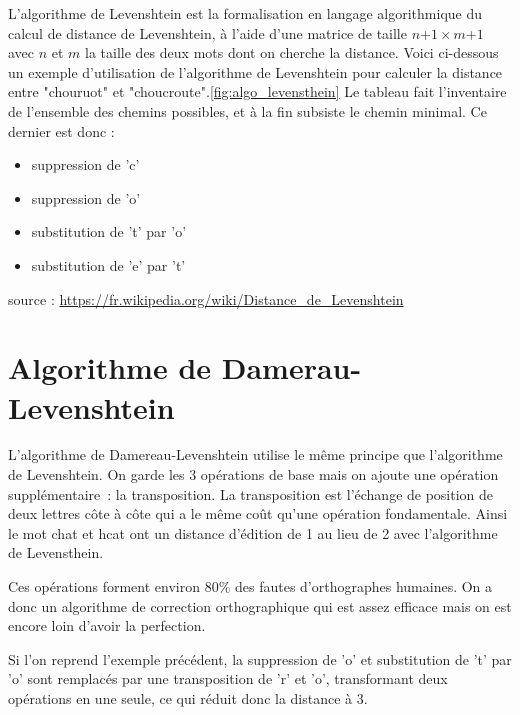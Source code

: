 \documentclass[final, 10pt]{report}
\begin{document}
L'algorithme de Levenshtein est la formalisation en langage algorithmique du calcul de distance de Levenshtein,  à l'aide d'une matrice de taille $n$+$1\times m$+$1$ avec $n$ et $m$ la taille des deux mots dont on cherche la distance.
Voici ci-dessous un exemple d'utilisation de l'algorithme de Levenshtein pour calculer la distance entre "chouruot" et "choucroute".\ref{fig:algo_levensthein}
Le tableau fait l'inventaire de l'ensemble des chemins possibles, et à la fin subsiste le chemin minimal.
Ce dernier est donc :
\begin{itemize}
    \item suppression de 'c'
    \item suppression de 'o'
    \item substitution de 't' par 'o'
    \item substitution de 'e' par 't'
\end{itemize}

\footnotesize source : \url{https://fr.wikipedia.org/wiki/Distance_de_Levenshtein}
\normalsize

\section{Algorithme de Damerau-Levenshtein\cite{noauthor_distance_2020}}

    L'algorithme de Damereau-Levenshtein utilise le même principe que l'algorithme de Levenshtein.
    On garde les 3 opérations de base mais on ajoute une opération supplémentaire~: la transposition.
    La transposition est l'échange de position de deux lettres côte à côte qui a le même coût qu'une opération fondamentale.
    Ainsi le mot \fg chat \og{} et \fg hcat\fg{} ont un distance d'édition de 1 au lieu de 2 avec l'algorithme de Levensthein.
    
    Ces opérations forment environ 80\% des fautes d'orthographes humaines.
    On a donc un algorithme de correction orthographique qui est assez efficace mais on est encore loin d'avoir la perfection.
    
    Si l'on reprend l'exemple précédent, la suppression de 'o' et substitution de 't' par 'o' sont remplacés par une transposition de 'r' et 'o', transformant deux opérations en une seule, ce qui réduit donc la distance à 3.
    
\end{document}
